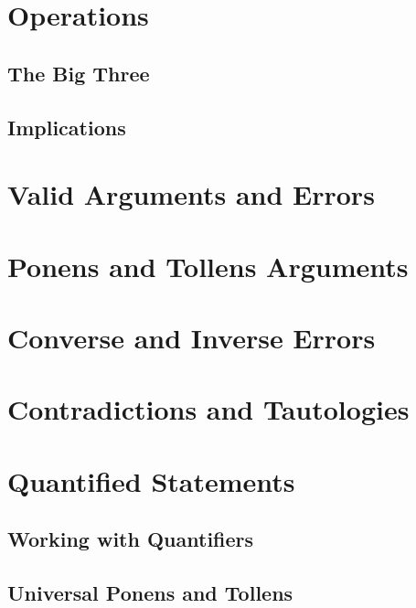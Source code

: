 \section{Operations}
    \subsection{The Big Three}
    \subsection{Implications}
    
\section{Valid Arguments and Errors}
    \section{Ponens and Tollens Arguments}
    \section{Converse and Inverse Errors}
    \section{Contradictions and Tautologies}
    
\section{Quantified Statements}
    \subsection{Working with Quantifiers}
    \subsection{Universal Ponens and Tollens}

%     

%     

%     

%     
